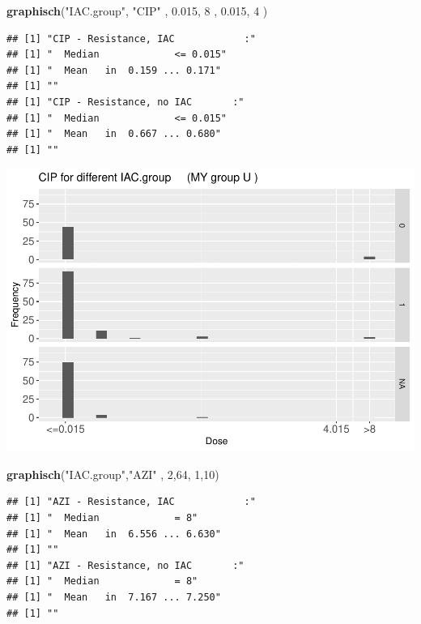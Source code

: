 \documentclass[
]{article}
\newenvironment{Shaded}{\begin{snugshade}}{\end{snugshade}}
\newcommand{\DecValTok}[1]{\textcolor[rgb]{0.00,0.00,0.81}{#1}}
\newcommand{\FloatTok}[1]{\textcolor[rgb]{0.00,0.00,0.81}{#1}}
\newcommand{\KeywordTok}[1]{\textcolor[rgb]{0.13,0.29,0.53}{\textbf{#1}}}
\newcommand{\NormalTok}[1]{#1}
\newcommand{\StringTok}[1]{\textcolor[rgb]{0.31,0.60,0.02}{#1}}
\begin{document}
\begin{Shaded}
\begin{Highlighting}[]
  \KeywordTok{graphisch}\NormalTok{(}\StringTok{"IAC.group"}\NormalTok{, }\StringTok{"CIP"}\NormalTok{ , }\FloatTok{0.015}\NormalTok{,   }\DecValTok{8}\NormalTok{   ,   }\FloatTok{0.015}\NormalTok{,   }\DecValTok{4}\NormalTok{     ) }
\end{Highlighting}
\end{Shaded}

\begin{verbatim}
## [1] "CIP - Resistance, IAC            :"
## [1] "  Median             <= 0.015"
## [1] "  Mean   in  0.159 ... 0.171"
## [1] ""
## [1] "CIP - Resistance, no IAC       :"
## [1] "  Median             <= 0.015"
## [1] "  Mean   in  0.667 ... 0.680"
## [1] ""
\end{verbatim}

\includegraphics{Verteilungen_files/figure-latex/unnamed-chunk-7-1.pdf}

\begin{Shaded}
\begin{Highlighting}[]
   \KeywordTok{graphisch}\NormalTok{(}\StringTok{"IAC.group"}\NormalTok{,}\StringTok{"AZI"}\NormalTok{ , }\DecValTok{2}\NormalTok{,}\DecValTok{64}\NormalTok{,   }\DecValTok{1}\NormalTok{,}\DecValTok{10}\NormalTok{)}
\end{Highlighting}
\end{Shaded}

\begin{verbatim}
## [1] "AZI - Resistance, IAC            :"
## [1] "  Median             = 8"
## [1] "  Mean   in  6.556 ... 6.630"
## [1] ""
## [1] "AZI - Resistance, no IAC       :"
## [1] "  Median             = 8"
## [1] "  Mean   in  7.167 ... 7.250"
## [1] ""
\end{verbatim}
\end{document}
